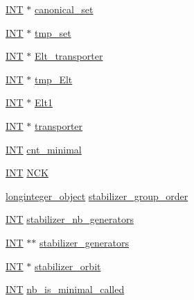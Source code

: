 \begin{DoxyCompactItemize}
\item 
\mbox{\hyperlink{galois_8h_a09fddde158a3a20bd2dcadb609de11dc}{I\+NT}} $\ast$ \mbox{\hyperlink{classisomorph_a62a6148552d3eb88d8effafab7ecca53}{canonical\+\_\+set}}
\item 
\mbox{\hyperlink{galois_8h_a09fddde158a3a20bd2dcadb609de11dc}{I\+NT}} $\ast$ \mbox{\hyperlink{classisomorph_a7bf9662954240279516583be1a9afd81}{tmp\+\_\+set}}
\item 
\mbox{\hyperlink{galois_8h_a09fddde158a3a20bd2dcadb609de11dc}{I\+NT}} $\ast$ \mbox{\hyperlink{classisomorph_a6894f9fb1c9a674d5110d90594270675}{Elt\+\_\+transporter}}
\item 
\mbox{\hyperlink{galois_8h_a09fddde158a3a20bd2dcadb609de11dc}{I\+NT}} $\ast$ \mbox{\hyperlink{classisomorph_ac5900a10a991a49726a0bcd80a0c785d}{tmp\+\_\+\+Elt}}
\item 
\mbox{\hyperlink{galois_8h_a09fddde158a3a20bd2dcadb609de11dc}{I\+NT}} $\ast$ \mbox{\hyperlink{classisomorph_a1b828b02925786230c9c34b0d1e1aa89}{Elt1}}
\item 
\mbox{\hyperlink{galois_8h_a09fddde158a3a20bd2dcadb609de11dc}{I\+NT}} $\ast$ \mbox{\hyperlink{classisomorph_ad835b4f9fdd2cc4f486ff10972f43758}{transporter}}
\item 
\mbox{\hyperlink{galois_8h_a09fddde158a3a20bd2dcadb609de11dc}{I\+NT}} \mbox{\hyperlink{classisomorph_acf0a17ace0e9a158f0d090416598601c}{cnt\+\_\+minimal}}
\item 
\mbox{\hyperlink{galois_8h_a09fddde158a3a20bd2dcadb609de11dc}{I\+NT}} \mbox{\hyperlink{classisomorph_afdb57daf820ebc3872bf2a0e26866744}{N\+CK}}
\item 
\mbox{\hyperlink{classlonginteger__object}{longinteger\+\_\+object}} \mbox{\hyperlink{classisomorph_a685064b9037f82e3fe0c810dcd3db619}{stabilizer\+\_\+group\+\_\+order}}
\item 
\mbox{\hyperlink{galois_8h_a09fddde158a3a20bd2dcadb609de11dc}{I\+NT}} \mbox{\hyperlink{classisomorph_a4a4109215d1a95059c4c3fc2cedfd6a9}{stabilizer\+\_\+nb\+\_\+generators}}
\item 
\mbox{\hyperlink{galois_8h_a09fddde158a3a20bd2dcadb609de11dc}{I\+NT}} $\ast$$\ast$ \mbox{\hyperlink{classisomorph_a733d516edce93eb4532c06e17e849675}{stabilizer\+\_\+generators}}
\item 
\mbox{\hyperlink{galois_8h_a09fddde158a3a20bd2dcadb609de11dc}{I\+NT}} $\ast$ \mbox{\hyperlink{classisomorph_af747b7363575adaae721e08ad1687d00}{stabilizer\+\_\+orbit}}
\item 
\mbox{\hyperlink{galois_8h_a09fddde158a3a20bd2dcadb609de11dc}{I\+NT}} \mbox{\hyperlink{classisomorph_a371afa4a2d86cdf89b36266434ed4735}{nb\+\_\+is\+\_\+minimal\+\_\+called}}
$$
\end{DoxyCompactItemize}
